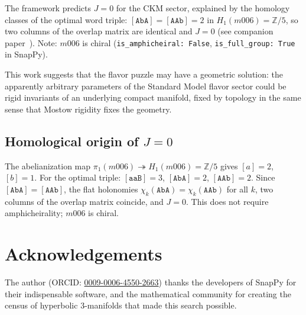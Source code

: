 \documentclass[11pt,a4paper]{article}
\begin{document}
The framework predicts $J = 0$ for the CKM sector, explained by the homology classes of the optimal word triple: $[\texttt{AbA}] = [\texttt{AAb}] = 2$ in $H_1(m006)=\mathbb{Z}/5$, so two columns of the overlap matrix are identical and $J=0$ (see companion paper~\cite{Gentry:CP}). Note: $m006$ is chiral (\texttt{is\_amphicheiral: False}, \texttt{is\_full\_group: True} in SnapPy).

This work suggests that the flavor puzzle may have a geometric 
solution: the apparently arbitrary parameters of the Standard Model 
flavor sector could be rigid invariants of an underlying compact 
manifold, fixed by topology in the same sense that Mostow rigidity 
fixes the geometry.

\subsection*{Homological origin of $J=0$}
\label{subsec:hom_cp}
The abelianization map $\pi_1(m006)\twoheadrightarrow H_1(m006)=\mathbb{Z}/5$
gives $[a]=2$, $[b]=1$. For the optimal triple:
$[\texttt{aaB}]=3$, $[\texttt{AbA}]=2$, $[\texttt{AAb}]=2$.
Since $[\texttt{AbA}]=[\texttt{AAb}]$, the flat holonomies
$\chi_k(\texttt{AbA})=\chi_k(\texttt{AAb})$ for all $k$,
two columns of the overlap matrix coincide, and $J=0$.
This does not require amphicheirality; $m006$ is chiral.

\section*{Acknowledgements}
The author (ORCID: \href{https://orcid.org/0009-0006-4550-2663}{0009-0006-4550-2663})
thanks the developers of SnapPy for their indispensable
software, and the mathematical community for creating the census of
hyperbolic 3-manifolds that made this search possible.
\end{document}
